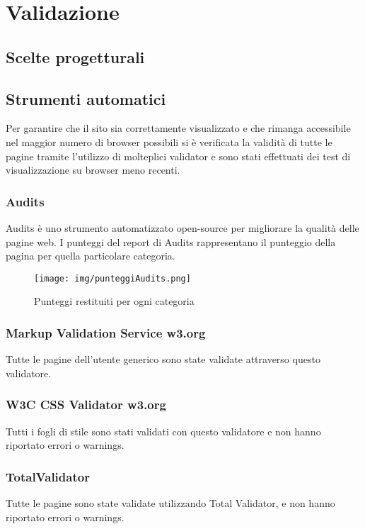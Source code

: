
\section{Validazione}
 

\subsection{Scelte progetturali}

\subsection{Strumenti automatici}
Per garantire che il sito sia correttamente visualizzato e che rimanga accessibile nel maggior numero di browser possibili si è verificata la validità di tutte le pagine tramite l'utilizzo di molteplici validator e sono stati effettuati dei test di visualizzazione su browser meno recenti.


\subsubsection{Audits}
Audits è uno strumento automatizzato open-source per migliorare la qualità delle pagine web.
I punteggi del report di Audits rappresentano il punteggio della pagina per quella particolare categoria.
\begin{figure}[H]
	\centerline{\texttt{[image: img/punteggiAudits.png]}}
	\caption{Punteggi restituiti per ogni categoria}
\end{figure}



\subsubsection{Markup Validation Service w3.org}
Tutte le pagine dell'utente generico sono state validate attraverso questo validatore. 

\subsubsection{W3C CSS Validator w3.org}
Tutti i fogli di stile sono stati validati con questo validatore e non hanno riportato errori o warnings.

\subsubsection{TotalValidator}
Tutte le pagine sono state validate utilizzando Total Validator, e non hanno riportato errori o warnings.



